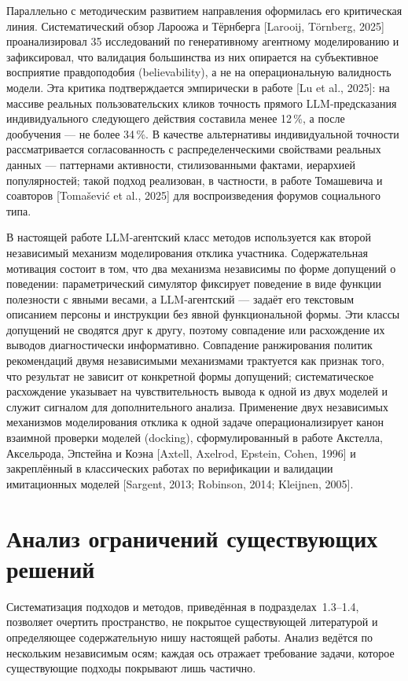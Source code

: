 Параллельно с методическим развитием направления оформилась его критическая линия. Систематический обзор Лароожа и Тёрнберга [Larooij, Törnberg, 2025] проанализировал 35 исследований по генеративному агентному моделированию и зафиксировал, что валидация большинства из них опирается на субъективное восприятие правдоподобия (believability), а не на операциональную валидность модели. Эта критика подтверждается эмпирически в работе [Lu et al., 2025]: на массиве реальных пользовательских кликов точность прямого LLM-предсказания индивидуального следующего действия составила менее 12\,\%, а после дообучения --- не более 34\,\%. В качестве альтернативы индивидуальной точности рассматривается согласованность с распределенческими свойствами реальных данных --- паттернами активности, стилизованными фактами, иерархией популярностей; такой подход реализован, в частности, в работе Томашевича и соавторов [Tomašević et al., 2025] для воспроизведения форумов социального типа.

В настоящей работе LLM-агентский класс методов используется как второй независимый механизм моделирования отклика участника. Содержательная мотивация состоит в том, что два механизма независимы по форме допущений о поведении: параметрический симулятор фиксирует поведение в виде функции полезности с явными весами, а LLM-агентский --- задаёт его текстовым описанием персоны и инструкции без явной функциональной формы. Эти классы допущений не сводятся друг к другу, поэтому совпадение или расхождение их выводов диагностически информативно. Совпадение ранжирования политик рекомендаций двумя независимыми механизмами трактуется как признак того, что результат не зависит от конкретной формы допущений; систематическое расхождение указывает на чувствительность вывода к одной из двух моделей и служит сигналом для дополнительного анализа. Применение двух независимых механизмов моделирования отклика к одной задаче операционализирует канон взаимной проверки моделей (docking), сформулированный в работе Акстелла, Аксельрода, Эпстейна и Коэна [Axtell, Axelrod, Epstein, Cohen, 1996] и закреплённый в классических работах по верификации и валидации имитационных моделей [Sargent, 2013; Robinson, 2014; Kleijnen, 2005].


\section{Анализ ограничений существующих решений}

Систематизация подходов и методов, приведённая в подразделах~1.3--1.4, позволяет очертить пространство, не покрытое существующей литературой и определяющее содержательную нишу настоящей работы. Анализ ведётся по нескольким независимым осям; каждая ось отражает требование задачи, которое существующие подходы покрывают лишь частично.

